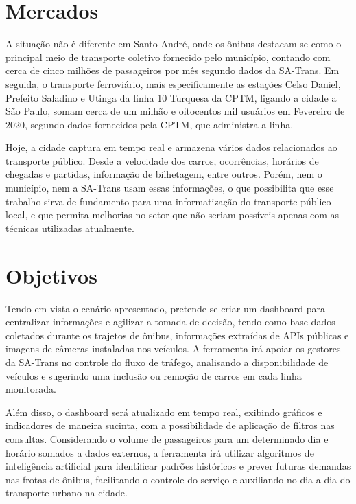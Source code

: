 \section{Mercados}
\indent
\begin{comment}
\par A situação não é diferente em Santo André, onde os ônibus destacam-se como o principal meio de transporte coletivo fornecido pelo município, contando com cerca de cinco milhões de passageiros por mês segundo dados da SA-Trans. Em seguida, o transporte ferroviário, mais especificamente as estações Celso Daniel, Prefeito Saladino e Utinga da linha 10 Turquesa da CPTM, ligando a cidade a São Paulo, garantem o segundo lugar no ranking, somando cerca de um milhão e oitocentos mil usuários em Fevereiro de 2020, segundo dados fornecidos pela CPTM, que administra a linha.
\end{comment}
\par A situação não é diferente em Santo André, onde os ônibus destacam-se como o principal meio de transporte coletivo fornecido pelo município, contando com cerca de cinco milhões de passageiros por mês segundo dados da SA-Trans. Em seguida, o transporte ferroviário, mais especificamente as estações Celso Daniel, Prefeito Saladino e Utinga da linha 10 Turquesa da CPTM, ligando a cidade a São Paulo, somam cerca de um milhão e oitocentos mil usuários em Fevereiro de 2020, segundo dados fornecidos pela CPTM, que administra a linha.
\par Hoje, a cidade captura em tempo real e armazena vários dados relacionados ao transporte público. Desde a velocidade dos carros, ocorrências, horários de chegadas e partidas, informação de bilhetagem, entre outros. Porém, nem o município, nem a SA-Trans usam essas informações, o que possibilita que esse trabalho sirva de fundamento para uma informatização do transporte público local, e que permita melhorias no setor que não seriam possíveis apenas com as técnicas utilizadas atualmente.

\section{Objetivos}
\indent
\par Tendo em vista o cenário apresentado, pretende-se criar um dashboard para centralizar informações e agilizar a tomada de decisão, tendo como base dados coletados durante os trajetos de ônibus, informações extraídas de APIs públicas e imagens de câmeras instaladas nos veículos. A ferramenta irá apoiar os gestores da SA-Trans no controle do fluxo de tráfego, analisando a disponibilidade de veículos e sugerindo uma inclusão ou remoção de carros em cada linha monitorada.
\par Além disso, o dashboard será atualizado em tempo real, exibindo gráficos e indicadores de maneira sucinta, com a possibilidade de aplicação de filtros nas consultas. Considerando o volume de passageiros para um determinado dia e horário somados a dados externos, a ferramenta irá utilizar algoritmos de inteligência artificial para identificar padrões históricos e prever futuras demandas nas frotas de ônibus, facilitando o controle do serviço e auxiliando no dia a dia do transporte urbano na cidade.


